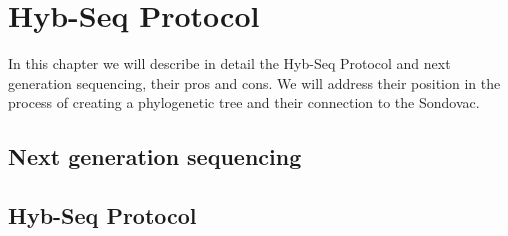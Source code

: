 \chapter[Hyb-Seq Protocol]{Hyb-Seq Protocol}
\label{kap:hyb_seq}

In this chapter we will describe in detail the Hyb-Seq Protocol and next generation sequencing, their pros 
and cons. We will address their position in the process of creating a phylogenetic tree and their connection 
to the Sondovac. 

\section{Next generation sequencing}

\section{Hyb-Seq Protocol}


